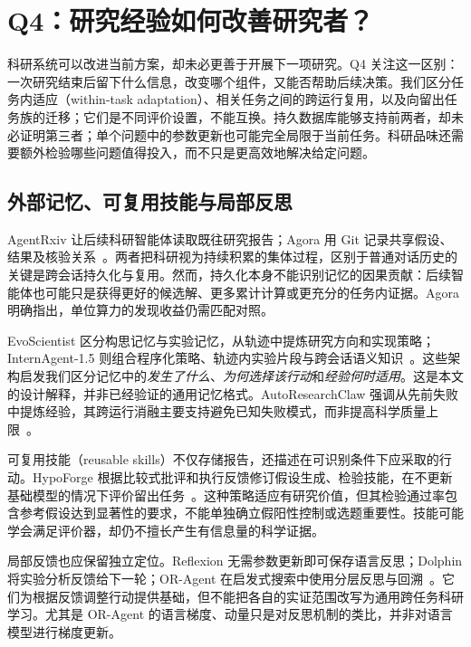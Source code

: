 \section{Q4：研究经验如何改善研究者？}
\label{sec:learning}

科研系统可以改进当前方案，却未必更善于开展下一项研究。Q4 关注这一区别：一次研究结束后留下什么信息，改变哪个组件，又能否帮助后续决策。我们区分任务内适应（within-task adaptation）、相关任务之间的跨运行复用，以及向留出任务族的迁移；它们是不同评价设置，不能互换。持久数据库能够支持前两者，却未必证明第三者；单个问题中的参数更新也可能完全局限于当前任务。科研品味还需要额外检验哪些问题值得投入，而不只是更高效地解决给定问题。

\subsection{外部记忆、可复用技能与局部反思}

AgentRxiv 让后续科研智能体读取既往研究报告；Agora 用 Git 记录共享假设、结果及核验关系~\cite{agentrxiv,agora}。两者把科研视为持续积累的集体过程，区别于普通对话历史的关键是跨会话持久化与复用。然而，持久化本身不能识别记忆的因果贡献：后续智能体也可能只是获得更好的候选解、更多累计计算或更充分的任务内证据。Agora 明确指出，单位算力的发现收益仍需匹配对照。

EvoScientist 区分构思记忆与实验记忆，从轨迹中提炼研究方向和实现策略；InternAgent-1.5 则组合程序化策略、轨迹内实验片段与跨会话语义知识~\cite{evoscientist,internagent-1-5}。这些架构启发我们区分记忆中的\emph{发生了什么}、\emph{为何选择该行动}和\emph{经验何时适用}。这是本文的设计解释，并非已经验证的通用记忆格式。AutoResearchClaw 强调从先前失败中提炼经验，其跨运行消融主要支持避免已知失败模式，而非提高科学质量上限~\cite{autoresearchclaw}。

可复用技能（reusable skills）不仅存储报告，还描述在可识别条件下应采取的行动。HypoForge 根据比较式批评和执行反馈修订假设生成、检验技能，在不更新基础模型的情况下评价留出任务~\cite{hypoforge}。这种策略适应有研究价值，但其检验通过率包含参考假设达到显著性的要求，不能单独确立假阳性控制或选题重要性。技能可能学会满足评价器，却仍不擅长产生有信息量的科学证据。

局部反馈也应保留独立定位。Reflexion 无需参数更新即可保存语言反思；Dolphin 将实验分析反馈给下一轮；OR-Agent 在启发式搜索中使用分层反思与回溯~\cite{reflexion,dolphin,or-agent}。它们为根据反馈调整行动提供基础，但不能把各自的实证范围改写为通用跨任务科研学习。尤其是 OR-Agent 的语言梯度、动量只是对反思机制的类比，并非对语言模型进行梯度更新。

